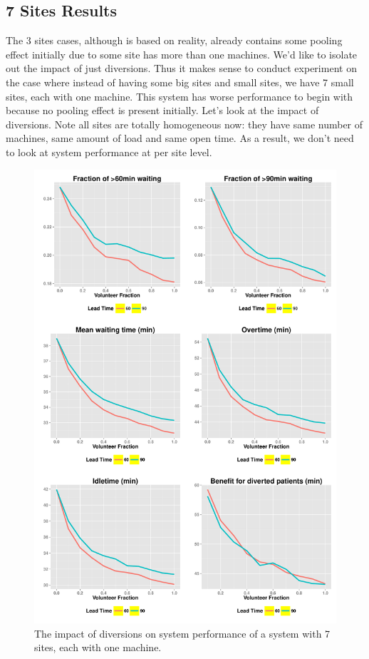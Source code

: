 \subsection{7 Sites Results}

The 3 sites cases, although is based on reality, already contains
some pooling effect initially due to some site has more than one
machines. We'd like to isolate out the impact of just diversions. Thus
it makes sense to conduct experiment on the case where instead of
having some big sites and small sites, we have 7 small sites, each
with one machine. This system has worse performance to begin with
because no pooling effect is present initially. Let's look at the
impact of diversions. Note all sites are totally homogeneous now:
they have same number of machines, same amount of load and
same open time. As a result, we don't need to look at system
performance at per site level.

\begin{figure}[htp]
\centering
\includegraphics[width=.96\textwidth]{chap3/numeric/pic/7sites_all}
\caption{The impact of diversions on system performance of a system
with 7 sites, each with one machine.}
\label{fig:7sites_all}
\end{figure}

